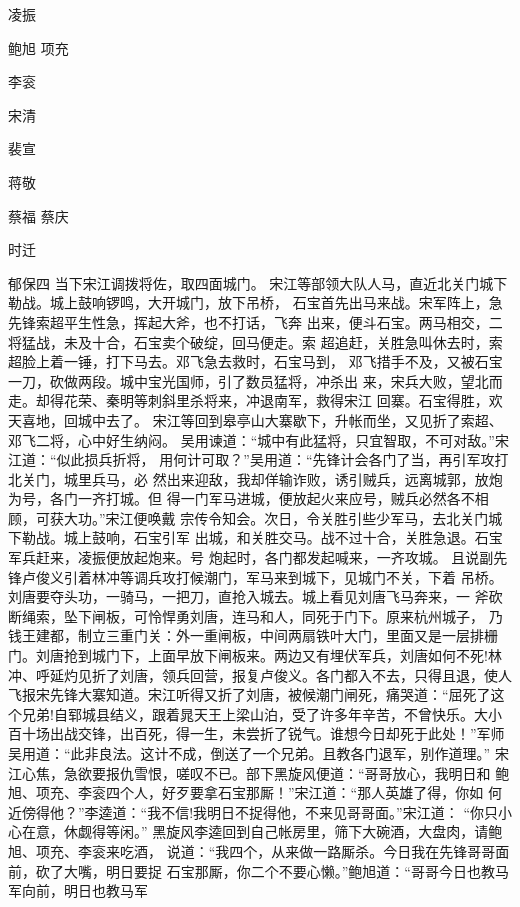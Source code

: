凌振

鲍旭
项充

李衮

宋清

裴宣

蒋敬

蔡福
蔡庆

时迁

郁保四
当下宋江调拨将佐，取四面城门。
宋江等部领大队人马，直近北关门城下勒战。城上鼓响锣鸣，大开城门，放下吊桥，
石宝首先出马来战。宋军阵上，急先锋索超平生性急，挥起大斧，也不打话，飞奔
出来，便斗石宝。两马相交，二将猛战，未及十合，石宝卖个破绽，回马便走。索
超追赶，关胜急叫休去时，索超脸上着一锤，打下马去。邓飞急去救时，石宝马到，
邓飞措手不及，又被石宝一刀，砍做两段。城中宝光国师，引了数员猛将，冲杀出
来，宋兵大败，望北而走。却得花荣、秦明等刺斜里杀将来，冲退南军，救得宋江
回寨。石宝得胜，欢天喜地，回城中去了。
宋江等回到皋亭山大寨歇下，升帐而坐，又见折了索超、邓飞二将，心中好生纳闷。
吴用谏道：“城中有此猛将，只宜智取，不可对敌。”宋江道：“似此损兵折将，
用何计可取？”吴用道：“先锋计会各门了当，再引军攻打北关门，城里兵马，必
然出来迎敌，我却佯输诈败，诱引贼兵，远离城郭，放炮为号，各门一齐打城。但
得一门军马进城，便放起火来应号，贼兵必然各不相顾，可获大功。”宋江便唤戴
宗传令知会。次日，令关胜引些少军马，去北关门城下勒战。城上鼓响，石宝引军
出城，和关胜交马。战不过十合，关胜急退。石宝军兵赶来，凌振便放起炮来。号
炮起时，各门都发起喊来，一齐攻城。
且说副先锋卢俊义引着林冲等调兵攻打候潮门，军马来到城下，见城门不关，下着
吊桥。刘唐要夺头功，一骑马，一把刀，直抢入城去。城上看见刘唐飞马奔来，一
斧砍断绳索，坠下闸板，可怜悍勇刘唐，连马和人，同死于门下。原来杭州城子，
乃钱王建都，制立三重门关：外一重闸板，中间两扇铁叶大门，里面又是一层排栅
门。刘唐抢到城门下，上面早放下闸板来。两边又有埋伏军兵，刘唐如何不死!林
冲、呼延灼见折了刘唐，领兵回营，报复卢俊义。各门都入不去，只得且退，使人
飞报宋先锋大寨知道。宋江听得又折了刘唐，被候潮门闸死，痛哭道：“屈死了这
个兄弟!自郓城县结义，跟着晁天王上梁山泊，受了许多年辛苦，不曾快乐。大小
百十场出战交锋，出百死，得一生，未尝折了锐气。谁想今日却死于此处！”军师
吴用道：“此非良法。这计不成，倒送了一个兄弟。且教各门退军，别作道理。”
宋江心焦，急欲要报仇雪恨，嗟叹不已。部下黑旋风便道：“哥哥放心，我明日和
鲍旭、项充、李衮四个人，好歹要拿石宝那厮！”宋江道：“那人英雄了得，你如
何近傍得他？”李逵道：“我不信!我明日不捉得他，不来见哥哥面。”宋江道：
“你只小心在意，休觑得等闲。”
黑旋风李逵回到自己帐房里，筛下大碗酒，大盘肉，请鲍旭、项充、李衮来吃酒，
说道：“我四个，从来做一路厮杀。今日我在先锋哥哥面前，砍了大嘴，明日要捉
石宝那厮，你二个不要心懒。”鲍旭道：“哥哥今日也教马军向前，明日也教马军
